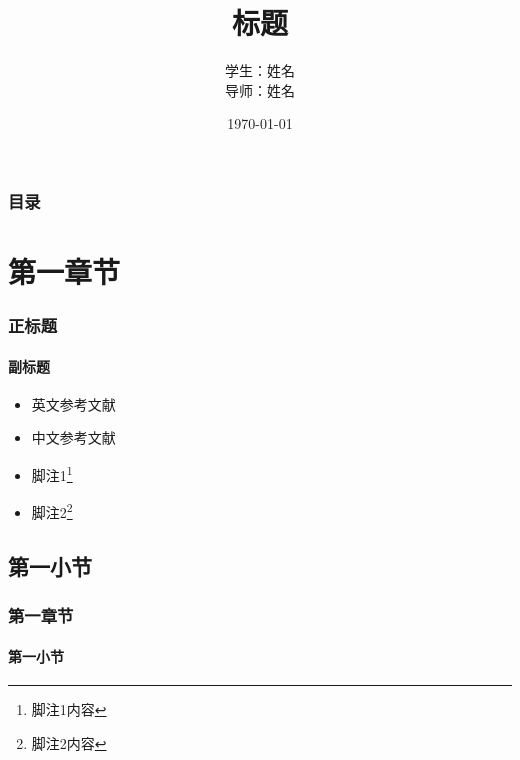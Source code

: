 \documentclass{beamer}
\title{标题}
\author{学生：姓名 \\ 导师：姓名}
\institute{院系}
\date{\today}
\begin{document}

\frame{\titlepage}


\begin{frame}
    \frametitle{目录}
    \tableofcontents[subsubsectionstyle=hide]
\end{frame}

\section{第一章节}

\begin{frame}
    \frametitle{正标题}
    \framesubtitle{副标题}
    \begin{itemize}
        \item 英文参考文献\cite{test-en}
        \item 中文参考文献\cite{test-zh}
        \item 脚注1\footnote{脚注1内容}
        \item 脚注2\footnote{脚注2内容}
    \end{itemize}
\end{frame}

\subsection{第一小节}

\begin{frame}
    \frametitle{第一章节}
    \framesubtitle{第一小节}
\end{frame}
\end{document}
